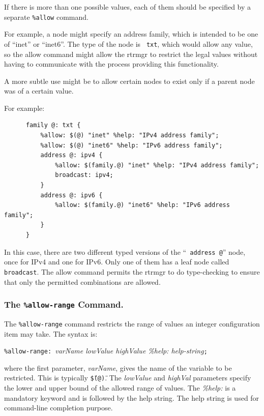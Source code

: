 \documentclass[11pt]{article}
\begin{document}
If there is more than one possible values, each of them should be
specified by a separate {\tt \%allow} command.

For example, a node might specify an address family, which is intended
to be one of ``inet'' or ``inet6''.  The type of the node is {\tt
txt}, which would allow any value, so the allow command might allow
the rtrmgr to restrict the legal values without having to
communicate with the process providing this functionality.

A more subtle use might be to allow certain nodes to exist only if a
parent node was of a certain value.

For example:

\begin{verbatim}
      family @: txt {
          %allow: $(@) "inet" %help: "IPv4 address family";
          %allow: $(@) "inet6" %help: "IPv6 address family";
          address @: ipv4 {
              %allow: $(family.@) "inet" %help: "IPv4 address family";
              broadcast: ipv4;
          }
          address @: ipv6 {
              %allow: $(family.@) "inet6" %help: "IPv6 address family";
          }
      }
\end{verbatim}

In this case, there are two different typed versions of the ``{\tt
address @}'' node, once for IPv4 and one for IPv6.  Only one of them has
a leaf node called {\tt broadcast}.  The allow command permits the
rtrmgr to do type-checking to ensure that only the permitted
combinations are allowed.

\subsubsection{The {\tt \%allow-range} Command.}

The {\tt \%allow-range} command restricts the range of values an
integer configuration item may take.  The syntax is:

\texttt{\%allow-range: }{\it varName lowValue highValue \%help: help-string}\texttt{;}

\noindent where the first parameter, \textit{varName}, gives the name
of the variable to be restricted.  This is typically
\texttt{\"\$(@)\"}.  The {\it lowValue} and {\it highVal} parameters
specify the lower and upper bound of the allowed range of values.
The {\it \%help:} is a mandatory keyword and is followed by the help
string. The help string is used for command-line completion purpose.
\end{document}
